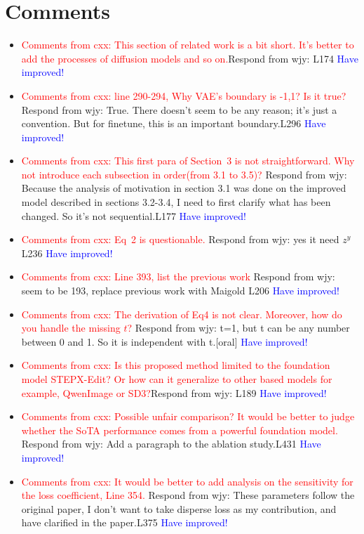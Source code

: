\documentclass{article} %
\newcommand{\cxx}[1]{\textcolor{red}{Comments from cxx: #1}}
\newcommand{\wjy}[1]{Respond from wjy: #1 \textcolor{blue}{Have improved!}}
\begin{document}
\section{Comments}
\begin{itemize}
    \item \cxx{This section of related work is a bit short. It's better to add the processes of diffusion models and so on.}\newline\wjy{L174}
    \item \cxx{line 290-294, Why VAE's boundary is -1,1? Is it true?}
    \newline \wjy{True. There doesn't seem to be any reason; it's just a convention. But for finetune, this is an important boundary.L296}
    \item  \cxx{This first para of Section~3 is not straightforward. Why not introduce each subsection in order(from 3.1 to 3.5)?}
    \newline \wjy{Because the analysis of motivation in section 3.1 was done on the improved model described in sections 3.2-3.4, I need to first clarify what has been changed. So it's not sequential.L177}
    \item \cxx{Eq~2 is questionable.} \wjy{yes it need $z^y$L236}
    \item \cxx{Line 393, list the previous work} \wjy{seem to be 193, replace previous work with Maigold L206}
    \item \cxx{The derivation of Eq4 is not clear. Moreover, how do you handle the missing $t$?} \wjy{t=1, but t can be any number between 0 and 1. So it is independent with t.[oral]}
    
    \item \cxx{Is this proposed method limited to the foundation model STEPX-Edit? Or how can it generalize to other based models for example, QwenImage or SD3?}\wjy{L189}

    \item \cxx{Possible unfair comparison? It would be better to judge whether the SoTA performance comes from a powerful foundation model. }\wjy{Add a paragraph to the ablation study.L431}

    \item \cxx{It would be better to add analysis on the sensitivity for the loss coefficient, Line 354.} \wjy{These parameters follow the original paper, I don't want to take disperse loss as my contribution, and have clarified in the paper.L375}
    
\end{itemize}



\end{document}
